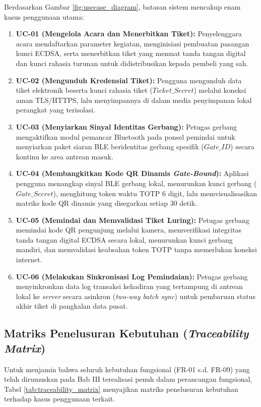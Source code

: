 Berdasarkan Gambar \ref{fig:usecase_diagram}, batasan sistem mencakup enam kasus penggunaan utama:
\begin{enumerate}
    \item \textbf{UC-01 (Mengelola Acara dan Menerbitkan Tiket):} Penyelenggara acara mendaftarkan parameter kegiatan, menginisiasi pembuatan pasangan kunci ECDSA, serta menerbitkan tiket yang memuat tanda tangan digital dan kunci rahasia turunan untuk didistribusikan kepada pembeli yang sah.
    \item \textbf{UC-02 (Mengunduh Kredensial Tiket):} Pengguna mengunduh data tiket elektronik beserta kunci rahasia tiket ($Ticket\_Secret$) melalui koneksi aman TLS/HTTPS, lalu menyimpannya di dalam media penyimpanan lokal perangkat yang terisolasi.
    \item \textbf{UC-03 (Menyiarkan Sinyal Identitas Gerbang):} Petugas gerbang mengaktifkan modul pemancar Bluetooth pada ponsel pemindai untuk menyiarkan paket siaran BLE beridentitas gerbang spesifik ($Gate\_ID$) secara kontinu ke area antrean masuk.
    \item \textbf{UC-04 (Membangkitkan Kode QR Dinamis \textit{Gate-Bound}):} Aplikasi pengguna menangkap sinyal BLE gerbang lokal, menurunkan kunci gerbang ($Gate\_Secret$), menghitung token waktu TOTP 6 digit, lalu memvisualisasikan matriks kode QR dinamis yang disegarkan setiap 30 detik.
    \item \textbf{UC-05 (Memindai dan Memvalidasi Tiket Luring):} Petugas gerbang memindai kode QR pengunjung melalui kamera, memverifikasi integritas tanda tangan digital ECDSA secara lokal, menurunkan kunci gerbang mandiri, dan memvalidasi keabsahan token TOTP tanpa memerlukan koneksi internet.
    \item \textbf{UC-06 (Melakukan Sinkronisasi Log Pemindaian):} Petugas gerbang menyinkronkan data log transaksi kehadiran yang tertampung di antrean lokal ke \textit{server} secara asinkron (\textit{two-way batch sync}) untuk pembaruan status akhir tiket di pangkalan data pusat.
\end{enumerate}

\subsection{Matriks Penelusuran Kebutuhan (\textit{Traceability Matrix})}
Untuk menjamin bahwa seluruh kebutuhan fungsional (FR-01 s.d. FR-09) yang telah dirumuskan pada Bab III terealisasi penuh dalam perancangan fungsional, Tabel \ref{tab:traceability_matrix} menyajikan matriks penelusuran kebutuhan terhadap kasus penggunaan terkait.

